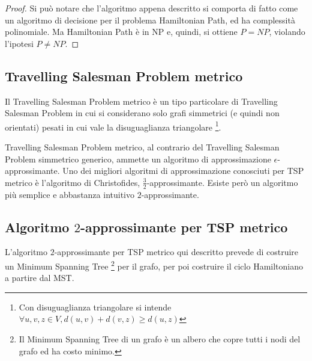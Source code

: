 \begin{proof}
    Si può notare che l'algoritmo appena descritto si comporta di fatto come un algoritmo di decisione per il problema Hamiltonian Path, ed ha complessità polinomiale.
    Ma Hamiltonian Path è in NP e, quindi, si ottiene $P = NP$, violando l'ipotesi $P \neq NP$.
\end{proof}

\subsection*{Travelling Salesman Problem metrico}
Il Travelling Salesman Problem metrico è un tipo particolare di Travelling Salesman Problem in cui si considerano solo grafi simmetrici (e quindi non orientati) pesati in cui vale la disuguaglianza triangolare \footnote{Con disuguaglianza triangolare si intende $\forall u, v, z \in V, d(u,v) + d(v,z) \ge d(u,z)$}.

Travelling Salesman Problem metrico, al contrario del Travelling Salesman Problem simmetrico generico, ammette un algoritmo di approssimazione $\epsilon$-approssimante. Uno dei migliori algoritmi di approssimazione conosciuti per TSP metrico è l'algoritmo di Christofides, $\frac{3}{2}$-approssimante.
Esiste però un algoritmo più semplice e abbastanza intuitivo $2$-approssimante.

\subsection{Algoritmo $2$-approssimante per TSP metrico}
L'algoritmo $2$-approssimante per TSP metrico qui descritto prevede di costruire un Minimum Spanning Tree \footnote{Il Minimum Spanning Tree di un grafo è un albero che copre tutti i nodi del grafo ed ha costo minimo.} per il grafo, per poi costruire il ciclo Hamiltoniano a partire dal MST.

